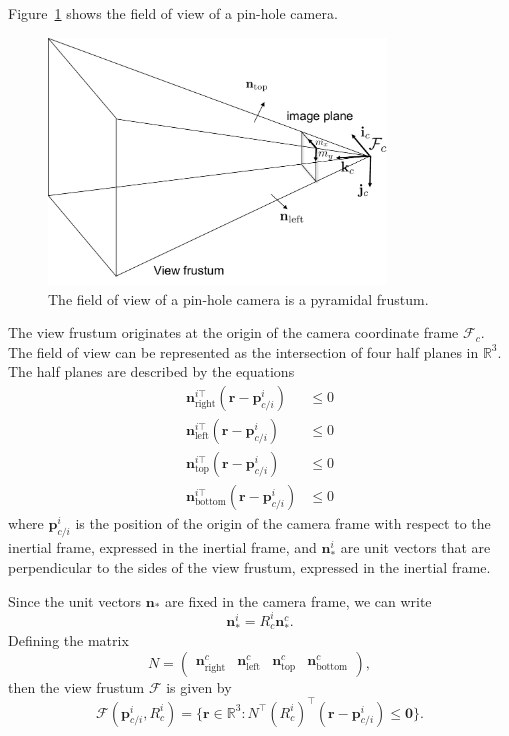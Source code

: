 Figure~\ref{fig:field_of_view} shows the field of view of a pin-hole camera.  
\begin{figure}
  \centering
  \includegraphics[width=0.8\textwidth]{chap6_camera_features/figures/field_of_view}
  \caption{The field of view of a pin-hole camera is a pyramidal frustum.}
  \label{fig:field_of_view}
\end{figure}
The view frustum originates at the origin of the camera coordinate frame $\mathcal{F}_c$.  The field of view can be represented as the intersection of four half planes in $\mathbb{R}^3$.  The half planes are described by the equations
\begin{align*}
\mathbf{n}_{\text{right}}^{i\top}(\mathbf{r}-\mathbf{p}_{c/i}^i) &\leq 0 \\
\mathbf{n}_{\text{left}}^{i\top}(\mathbf{r}-\mathbf{p}_{c/i}^i) &\leq 0 \\
\mathbf{n}_{\text{top}}^{i\top}(\mathbf{r}-\mathbf{p}_{c/i}^i) &\leq 0 \\
\mathbf{n}_{\text{bottom}}^{i\top}(\mathbf{r}-\mathbf{p}_{c/i}^i) &\leq 0 
\end{align*}
where $\mathbf{p}_{c/i}^i$ is the position of the origin of the camera frame with respect to the inertial frame, expressed in the inertial frame, and $\mathbf{n}_{\ast}^i$ are unit vectors that are perpendicular to the sides of the view frustum, expressed in the inertial frame.  

Since the unit vectors $\mathbf{n}_{\ast}$ are fixed in the camera frame, we can write
\[
\mathbf{n}_{\ast}^i = R_c^i \mathbf{n}_{\ast}^c.
\]
%
Defining the matrix
\[
N = \begin{pmatrix} \mathbf{n}_{\text{right}}^c & \mathbf{n}_{\text{left}}^c & \mathbf{n}_{\text{top}}^c & \mathbf{n}_{\text{bottom}}^c \end{pmatrix},
\]
then the view frustum $\mathcal{F}$ is given by
\[
\mathcal{F}(\mathbf{p}_{c/i}^i, R_c^i) = \{\mathbf{r}\in\mathbb{R}^3: N^\top (R_c^i)^\top  (\mathbf{r}-\mathbf{p}_{c/i}^i)\leq \mathbf{0} \}.
\]

